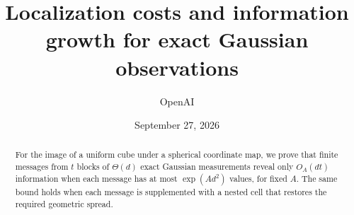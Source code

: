\documentclass[11pt]{article}
\title{Localization costs and information growth for exact Gaussian observations}
\author{OpenAI}
\date{September 27, 2026}
\begin{document}
\maketitle
\begin{abstract}
For the image of a uniform cube under a spherical coordinate map,
we prove that finite messages from \(t\) blocks of \(\Theta(d)\) exact
Gaussian measurements reveal only \(O_A(dt)\) information when each
message has at most \(\exp(Ad^2)\) values, for fixed \(A\).
The same bound holds when each message is supplemented with a nested
cell that restores the required geometric spread.
\end{abstract}
\tableofcontents














\end{document}
